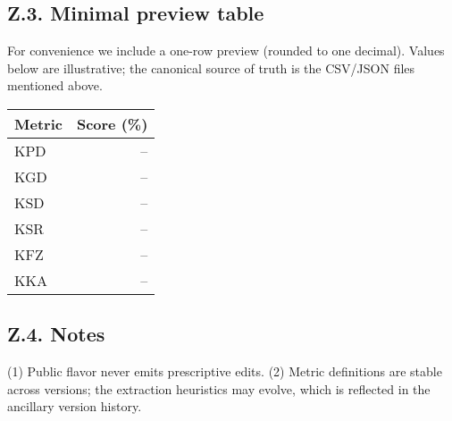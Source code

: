 \subsection*{Z.3. Minimal preview table}
For convenience we include a one-row preview (rounded to one decimal).
Values below are illustrative; the canonical source of truth is the
CSV/JSON files mentioned above.
\begin{center}
\begin{tabular}{l|r}
\hline
Metric & Score (\%) \\
\hline
KPD &  \,– \\
KGD &  \,– \\
KSD &  \,– \\
KSR &  \,– \\
KFZ &  \,– \\
KKA &  \,– \\
\hline
\end{tabular}
\end{center}

\subsection*{Z.4. Notes}
(1) Public flavor never emits prescriptive edits.  
(2) Metric definitions are stable across versions; the extraction
heuristics may evolve, which is reflected in the ancillary version history.
